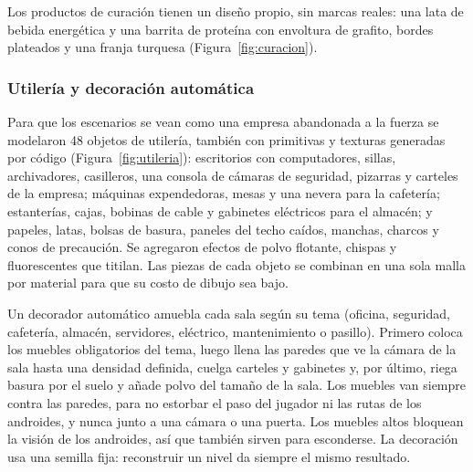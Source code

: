 

Los productos de curación tienen un diseño propio, sin marcas reales: una lata de bebida energética
y una barrita de proteína con envoltura de grafito, bordes plateados y una franja turquesa
(Figura~\ref{fig:curacion}).


\subsubsection{Utilería y decoración automática}

Para que los escenarios se vean como una empresa abandonada a la fuerza se modelaron 48 objetos de
utilería, también con primitivas y texturas generadas por código (Figura~\ref{fig:utileria}):
escritorios con computadores, sillas, archivadores, casilleros, una consola de cámaras de seguridad,
pizarras y carteles de la empresa; máquinas expendedoras, mesas y una nevera para la cafetería;
estanterías, cajas, bobinas de cable y gabinetes eléctricos para el almacén; y papeles, latas,
bolsas de basura, paneles del techo caídos, manchas, charcos y conos de precaución. Se agregaron
efectos de polvo flotante, chispas y fluorescentes que titilan. Las piezas de cada objeto se
combinan en una sola malla por material para que su costo de dibujo sea bajo.


Un decorador automático amuebla cada sala según su tema (oficina, seguridad, cafetería, almacén,
servidores, eléctrico, mantenimiento o pasillo). Primero coloca los muebles obligatorios del tema,
luego llena las paredes que ve la cámara de la sala hasta una densidad definida, cuelga carteles y
gabinetes y, por último, riega basura por el suelo y añade polvo del tamaño de la sala. Los muebles
van siempre contra las paredes, para no estorbar el paso del jugador ni las rutas de los androides,
y nunca junto a una cámara o una puerta. Los muebles altos bloquean la visión de los androides, así
que también sirven para esconderse. La decoración usa una semilla fija: reconstruir un nivel da
siempre el mismo resultado.


